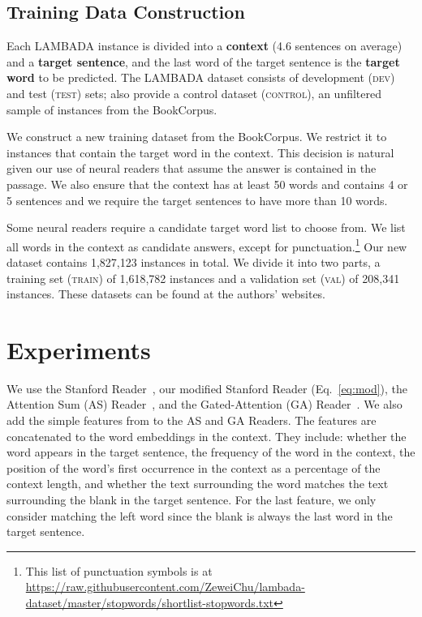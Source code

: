 \documentclass[11pt]{article}
\newcommand{\train}{\textsc{train}\xspace}
\newcommand{\val}{\textsc{val}\xspace}
\newcommand{\control}{\textsc{control}\xspace}
\newcommand{\dev}{\textsc{dev}\xspace}
\newcommand{\test}{\textsc{test}\xspace}
\begin{document}
\subsection{Training Data Construction}
\label{sec:data}

Each LAMBADA instance is divided into a \textbf{context} (4.6 sentences on average) and a \textbf{target sentence}, and the last word of the target sentence is the \textbf{target word} to be predicted. The LAMBADA dataset consists of development (\dev) and test (\test) sets;  also provide 
a control dataset (\control), an unfiltered sample of instances from the BookCorpus. 

We construct a new training dataset from the BookCorpus. 
We restrict it to instances that contain the target word in the context. 
This decision is natural given our use of neural readers that assume the answer is contained in the passage. We also ensure that the context has at least 50 words and contains 4 or 5 sentences and we require the target sentences to have more than 10 words. 

Some neural readers require a candidate target word list to choose from. 
We list all words in the context as candidate answers, except for punctuation.\footnote{This list of punctuation symbols is at \url{https://raw.githubusercontent.com/ZeweiChu/lambada-dataset/master/stopwords/shortlist-stopwords.txt}}
Our new dataset contains 1,827,123 instances in total. We divide it into two parts, a training set (\train) of 1,618,782 instances and a validation set (\val) of 208,341 instances. These datasets can be found at the authors' websites. 

\section{Experiments}

We use the Stanford Reader~\cite{danqi-reader:16}, our modified Stanford Reader (Eq.~\ref{eq:mod}), the Attention Sum (AS) Reader~\cite{as-reader:16}, and the Gated-Attention (GA) Reader~\cite{gated-as-reader:16}. 
We also add the simple features from  to the AS and GA Readers. 
The features are concatenated to the word embeddings in the context. They include: whether the word appears in the target sentence, the frequency of the word in the context, the position of the word's first occurrence in the context as a percentage of the context length, and whether the text surrounding the word matches the text surrounding the blank in the target sentence. For the last feature, we only consider matching the left word since the blank is always the last word in the target sentence.
\end{document}
